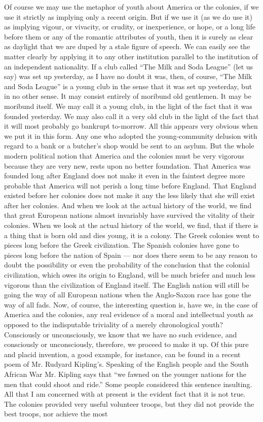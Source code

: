 Of course we may use the metaphor of youth about America or the colonies, if we use it strictly as implying only a recent origin. But if we use it (as we do use it) as implying vigour, or vivacity, or crudity, or inexperience, or hope, or a long life before them or any of the romantic attributes of youth, then it is surely as clear as daylight that we are duped by a stale figure of speech. We can easily see the matter clearly by applying it to any other institution parallel to the institution of an independent nationality. If a club called “The Milk and Soda League” (let us say) was set up yesterday, as I have no doubt it was, then, of course, “The Milk and Soda League” is a young club in the sense that it was set up yesterday, but in no other sense. It may consist entirely of moribund old gentlemen. It may be moribund itself. We may call it a young club, in the light of the fact that it was founded yesterday. We may also call it a very old club in the light of the fact that it will most probably go bankrupt to-morrow. All this appears very obvious when we put it in this form. Any one who adopted the young-community delusion with regard to a bank or a butcher’s shop would be sent to an asylum. But the whole modern political notion that America and the colonies must be very vigorous because they are very new, rests upon no better foundation. That America was founded long after England does not make it even in the faintest degree more probable that America will not perish a long time before England. That England existed before her colonies does not make it any the less likely that she will exist after her colonies. And when we look at the actual history of the world, we find that great European nations almost invariably have survived the vitality of their colonies. When we look at the actual history of the world, we find, that if there is a thing that is born old and dies young, it is a colony. The Greek colonies went to pieces long before the Greek civilization. The Spanish colonies have gone to pieces long before the nation of Spain — nor does there seem to be any reason to doubt the possibility or even the probability of the conclusion that the colonial civilization, which owes its origin to England, will be much briefer and much less vigorous than the civilization of England itself. The English nation will still be going the way of all European nations when the Anglo-Saxon race has gone the way of all fads. Now, of course, the interesting question is, have we, in the case of America and the colonies, any real evidence of a moral and intellectual youth as opposed to the indisputable triviality of a merely chronological youth? Consciously or unconsciously, we know that we have no such evidence, and consciously or unconsciously, therefore, we proceed to make it up. Of this pure and placid invention, a good example, for instance, can be found in a recent poem of Mr. Rudyard Kipling’s. Speaking of the English people and the South African War Mr. Kipling says that “we fawned on the younger nations for the men that could shoot and ride.” Some people considered this sentence insulting. All that I am concerned with at present is the evident fact that it is not true. The colonies provided very useful volunteer troops, but they did not provide the best troops, nor achieve the most 